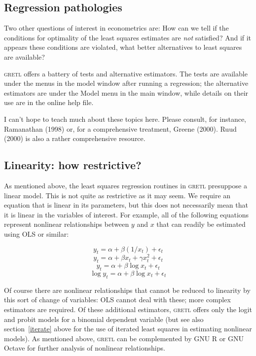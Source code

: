 \documentclass{article}
\begin{document}
\subsection{Regression pathologies}

Two other questions of interest in econometrics are:  How can we tell
if the conditions for optimality of the least squares estimates are
\textit{not} satisfied?  And if it appears these conditions are
violated, what better alternatives to least squares are available?  

\textsc{gretl} offers a battery of tests and alternative estimators.
The tests are available under the menus in the model window after
running a regression; the alternative estimators are under the Model
menu in the main window, while details on their use are in the online
help file.

I can't hope to teach much about these topics here.  Please consult,
for instance, Ramanathan (1998) or, for a comprehensive treatment,
Greene (2000).  Ruud (2000) is also a rather comprehensive resource.

\subsection{Linearity: how restrictive?}

As mentioned above, the least squares regression routines in
\textsc{gretl} presuppose a linear model.  This is not quite as
restrictive as it may seem.  We require an equation that is linear in
its parameters, but this does not necessarily mean that it is linear
in the variables of interest.  For example, all of the following
equations represent nonlinear relationships between $y$ and $x$ that
can readily be estimated using OLS or similar:

$$y_t = \alpha + \beta(1/x_t) + \epsilon_t$$
$$y_t = \alpha + \beta x_t + \gamma x^2_t + \epsilon_t$$
$$y_t = \alpha + \beta \log x_t + \epsilon_t$$
$$\log y_t = \alpha + \beta \log x_t + \epsilon_t$$

Of course there are nonlinear relationships that cannot be reduced to
linearity by this sort of change of variables: OLS cannot deal with
these; more complex estimators are required.  Of these additional
estimators, \textsc{gretl} offers only the logit and probit models for
a binomial dependent variable (but see also section~\ref{iterate}
above for the use of iterated least squares in estimating nonlinear
models).  As mentioned above, \textsc{gretl} can be complemented by
GNU R or GNU Octave for further analysis of nonlinear relationships.
\end{document}
